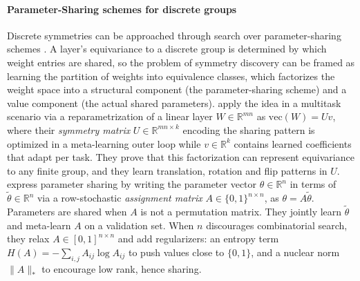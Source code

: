 \documentclass[mathematics,review,submit,moreauthors]{Definitions/mdpi}
\begin{document}
\paragraph{Parameter-Sharing schemes for discrete groups}
Discrete symmetries can be approached through search over parameter-sharing schemes \citep{zhou2021,yeh2022p2icais}.
A layer's equivariance to a discrete group is determined by which weight entries are shared, so the problem of symmetry discovery can be framed as learning the partition of weights into equivalence classes, which factorizes the weight space into a structural component (the parameter-sharing scheme) and a value component (the actual shared parameters).
\citet{zhou2021} apply the idea in a multitask scenario via a reparametrization of a linear layer $W\in \mathbb R^{mn}$ as $\mathrm{vec}(W) = Uv$, where their \emph{symmetry matrix} $U\in \mathbb R^{mn\times k}$ encoding the sharing pattern is optimized in a meta-learning outer loop while $v\in \mathbb R^k$ contains learned coefficients that adapt per task.
They prove that this factorization can represent equivariance to any finite group, and they learn translation, rotation and flip patterns in $U$.
\citet{yeh2022p2icais} express parameter sharing by writing the parameter vector $\theta\in \mathbb R^n$ in terms of $\tilde \theta\in \mathbb R^n$ via a row-stochastic \emph{assignment matrix} $A\in \{0,1\}^{n\times n}$, as $\theta=A \tilde \theta$.
Parameters are shared when $A$ is not a permutation matrix.
They jointly learn $\tilde \theta$ and meta-learn $A$ on a validation set.
When $n$ discourages combinatorial search, they relax $A\in [0,1]^{n\times n}$ and add regularizers: an entropy term $H(A) = -\sum_{i,j} A_{ij}\log A_{ij}$ to push values close to $\{0,1\}$, and a nuclear norm $\|A\|_*$ to encourage low rank, hence sharing.
\end{document}
